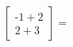 \documentclass[preview]{standalone}
\begin{document}
\begin{align*}
\begin{bmatrix} \text{-}1 + 2 \\ 2 + 3 \end{bmatrix} =
\end{align*}
\end{document}
